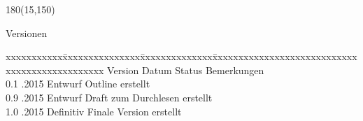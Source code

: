 \begin{textblock}{180}(15,150)
\color{black}
\begin{huge}
Versionen
\end{huge}
\vspace{10mm}

\fontsize{10pt}{18pt}\selectfont
\begin{tabbing}
xxxxxxxxxxx\=xxxxxxxxxxxxxxx\=xxxxxxxxxxxxxx\=xxxxxxxxxxxxxxxxxxxxxxxxxxxxxxxxxxxxxxxxxxxxxxx \kill
Version	\> Datum	\> Status		\> Bemerkungen		\\
0.1	.2015	\> Entwurf		\> Outline erstellt	\\
0.9 .2015   \> Entwurf      \> Draft zum Durchlesen erstellt \\
1.0 .2015   \> Definitiv      \> Finale Version erstellt \\

\end{tabbing}

\end{textblock}
